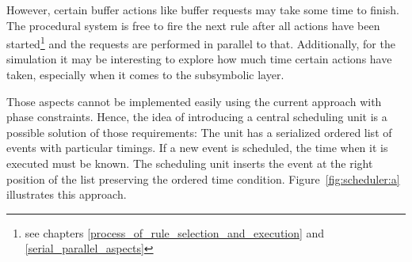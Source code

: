 However, certain buffer actions like buffer requests may take some time to finish. The procedural system is free to fire the next rule after all actions have been started\footnote{see chapters \ref{process_of_rule_selection_and_execution} and \ref{serial_parallel_aspects}} and the requests are performed in parallel to that. Additionally, for the simulation it may be interesting to explore how much time certain actions have taken, especially when it comes to the subsymbolic layer.

Those aspects cannot be implemented easily using the current approach with phase constraints. Hence, the idea of introducing a central scheduling unit is a possible solution of those requirements: The unit has a serialized ordered list of events with particular timings. If a new event is scheduled, the time when it is executed must be known. The scheduling unit inserts the event at the right position of the list preserving the ordered time condition. Figure~\ref{fig:scheduler:a} illustrates this approach.

